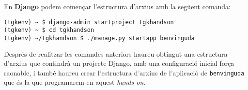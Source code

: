 \documentclass[12pt,a4paper]{article}
\begin{document}
En \textbf{Django} podem començar l'estructura d'arxius amb la següent comanda:

\begin{verbatim}
(tgkenv) ~ $ django-admin startproject tgkhandson
(tgkenv) ~ $ cd tgkhandson
(tgkenv) ~/tgkhandson $ ./manage.py startapp benvinguda
\end{verbatim}

Després de realitzar les comandes anteriors haureu obtingut una estructura d'arxius que contindrà un projecte Django, amb una configuració inicial força raonable, i també haureu crear l'estructura d'arxius de l'aplicació de \verb+benvinguda+ que és la que programarem en aquest \emph{hands-on}.
\end{document}
